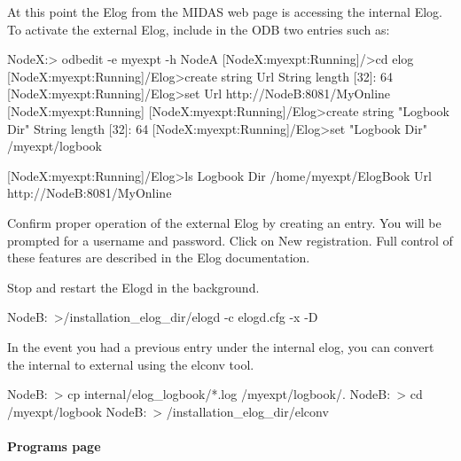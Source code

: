 \begin{DoxyItemize}
\begin{DoxyItemize}
\begin{DoxyEnumerate}
\item At this point the Elog from the MIDAS web page is accessing the internal Elog. To activate the external Elog, include in the ODB two entries such as: 
\begin{DoxyCode}
   NodeX:> odbedit -e myexpt -h NodeA
   [NodeX:myexpt:Running]/>cd elog
   [NodeX:myexpt:Running]/Elog>create string Url
   String length [32]: 64
   [NodeX:myexpt:Running]/Elog>set Url http://NodeB:8081/MyOnline
   [NodeX:myexpt:Running]
   [NodeX:myexpt:Running]/Elog>create string "Logbook Dir"
   String length [32]: 64
   [NodeX:myexpt:Running]/Elog>set "Logbook Dir" /myexpt/logbook

   [NodeX:myexpt:Running]/Elog>ls
Logbook Dir                     /home/myexpt/ElogBook
Url                             http://NodeB:8081/MyOnline
\end{DoxyCode}

\item Confirm proper operation of the external Elog by creating an entry. You will be prompted for a username and password. Click on New registration. Full control of these features are described in the Elog documentation.
\item Stop and restart the Elogd in the background. 
\begin{DoxyCode}
   NodeB:~>/installation_elog_dir/elogd -c elogd.cfg -x -D
\end{DoxyCode}

\item In the event you had a previous entry under the internal elog, you can convert the internal to external using the elconv tool. 
\begin{DoxyCode}
   NodeB:~> cp internal/elog_logbook/*.log /myexpt/logbook/.
   NodeB:~> cd /myexpt/logbook
   NodeB:~> /installation_elog_dir/elconv
\end{DoxyCode}

\end{DoxyEnumerate}


\end{DoxyItemize}
\end{DoxyItemize}\par




\par
 \label{index_end}
\hypertarget{index_end}{}
 \paragraph{Programs page}\label{RC_mhttpd_Program_page}
\label{RC_mhttpd_Program_page_idx_mhttpd_page_program}
\hypertarget{RC_mhttpd_Program_page_idx_mhttpd_page_program}{}
 \par




